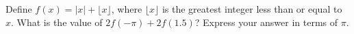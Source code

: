 Define $f(x)=|x|+\lfloor x\rfloor$, where $\lfloor x\rfloor$ is the greatest integer less than or equal to $x$. What is the value of $2f(-\pi)+2f(1.5)$? Express your answer in terms of $\pi$.
